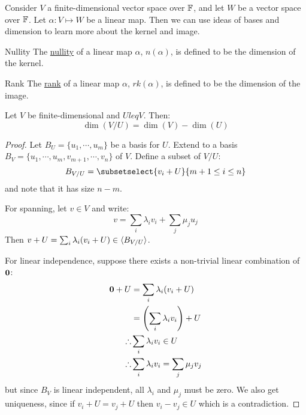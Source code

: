 \documentclass[../Main.tex]{subfiles}
\begin{document}
Consider $V$ a finite-dimensional vector space over $\mathbb{F}$, and let $W$ be a vector space over $\mathbb{F}$. Let $\alpha : V \mapsto W$ be a linear map. Then we can use ideas of bases and dimension to learn more about the kernel and image.
\begin{definition}{Nullity}
    The \underline{nullity} of a linear map $\alpha$, $n(\alpha)$, is defined to be the dimension of the kernel. 
\end{definition}
\begin{definition}{Rank}
    The \underline{rank} of a linear map $\alpha$, $rk(\alpha)$, is defined to be the dimension of the image.
\end{definition}
\begin{lemma}
    Let $V$ be finite-dimensional and $U leq V$. Then:
    \begin{equation}
        \dim(V / U) = \dim(V) - \dim(U)
        \label{eqnQuotientSizes}
    \end{equation}
    \label{lemQuotientSizes}
\end{lemma}
\begin{proof}
    Let $B_U = \{u_1, \cdots, u_m\}$ be a basis for $U$. Extend to a basis $B_V = \{u_1, \cdots, u_m, v_{m+1}, \cdots, v_n\}$ of $V$. Define a subset of $V / U$:
    \begin{equation*}
        B_{V / U} = \subsetselect{v_i + U}{m+1 \leq i \leq n}
    \end{equation*}
    and note that it has size $n - m$.

    For spanning, let $v \in V$ and write:
    \begin{equation*}
        v = \sum_{i} \lambda_i v_i + \sum_{j} \mu_j u_j
    \end{equation*}
    Then $v + U = \sum_i \lambda_i(v_i + U) \in \langle B_{V / U} \rangle$.

    For linear independence, suppose there exists a non-trivial linear combination of $\boldsymbol{0}$:
    \begin{align*}
        \boldsymbol{0} + U &= \sum_i \lambda_i(v_i + U) \\
        &= \left(\sum_i \lambda_i v_i\right) + U \\
        \therefore &\sum_i \lambda_i v_i \in U \\
        \therefore &\sum_i \lambda_i v_i = \sum_j \mu_j v_j
    \end{align*}
    but since $B_V$ is linear independent, all $\lambda_i$ and $\mu_j$ must be zero. We also get uniqueness, since if $v_i + U = v_j + U$ then $v_i - v_j \in U$ which is a contradiction.
\end{proof}
\end{document}
